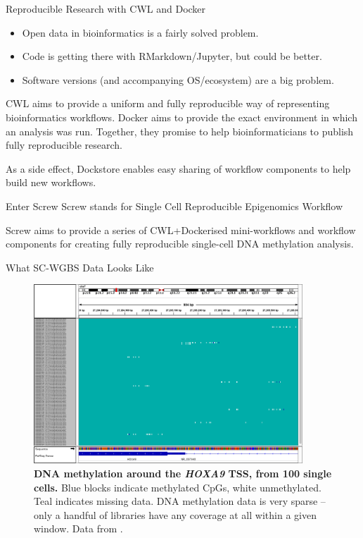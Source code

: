 \documentclass{beamer}
\begin{document}
\begin{frame}
\begin{columns}[t]
\begin{column}{.32\textwidth}
\begin{block}{Reproducible Research with CWL and Docker}
\begin{itemize}
\item Open data in bioinformatics is a fairly solved problem.
\item Code is getting there with RMarkdown/Jupyter, but could be better.
\item Software versions (and accompanying OS/ecosystem) are a big problem.
\end{itemize}
CWL aims to provide a uniform and fully reproducible way of representing bioinformatics workflows. Docker aims to provide the exact environment in which an analysis was run. Together, they promise to help bioinformaticians to publish fully reproducible research.

As a side effect, Dockstore enables easy sharing of workflow components to help build new workflows. 
\end{block}


\begin{block}{Enter Screw}
Screw stands for Single Cell Reproducible Epigenomics Workflow

Screw aims to provide a series of CWL+Dockerised mini-workflows and workflow components for creating fully reproducible single-cell DNA methylation analysis.
\end{block}


\begin{block}{What SC-WGBS Data Looks Like}
\begin{figure}
\begin{center}
\includegraphics[width=0.9\textwidth]{figures/hoxa9_meth.png}

\end{center}
\caption{\textbf{DNA methylation around the \textit{HOXA9} TSS, from 100 single cells.}  Blue blocks indicate methylated CpGs, white unmethylated. Teal indicates missing data. DNA methylation data is very sparse -- only a handful of libraries have any coverage at all within a given window. Data from \cite{Farlik2016}.}
\end{figure}
\end{block}


\end{column}
\end{columns}
\end{frame}
\end{document}
